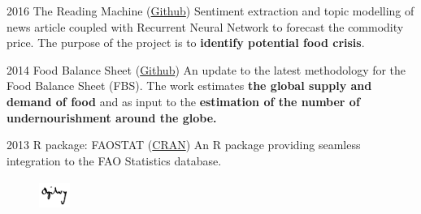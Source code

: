 \documentclass{tccv}
\begin{document}
\begin{yearlist}
\item{2016} {The Reading Machine
  (\href{https://github.com/EST-Team-Adam/TheReadingMachine}{Github})}
  {Sentiment extraction and topic modelling of news article coupled
    with Recurrent Neural Network to forecast the commodity price. The
    purpose of the project is to \textbf{identify potential food
      crisis}.}

  
\item{2014} {Food Balance Sheet
  (\href{https://github.com/SWS-Methodology}{Github})} {An update to
  the latest methodology for the Food Balance Sheet (FBS). The work
  estimates \textbf{the global supply and demand of food} and as input
  to the \textbf{estimation of the number of undernourishment around
    the globe.}}
  



\item{2013}
     {R package: FAOSTAT
       (\href{http://cran.r-project.org/web/packages/FAOSTAT/index.html}{CRAN})}
     {An R package providing seamless integration to the FAO
       Statistics database.}
  
\end{yearlist}


\begin{figure}[h!] %
  \centering
  \includegraphics[width=1cm,height=1cm]{../company_icon/ogilvy.jpg}
\end{figure}
\end{document}
